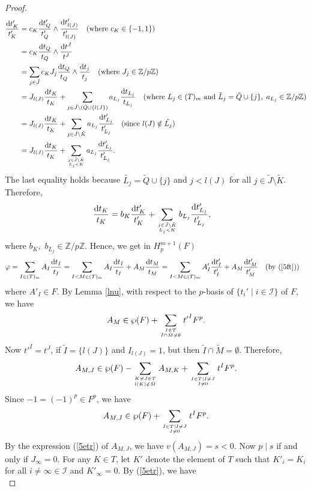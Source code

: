 \documentclass[times,10pt]{amsart}
\newcommand{\Z}{\ensuremath{\mathbb{Z}}}
\newcommand{\dd}{{\rm d}}
\newcommand{\I}{\ensuremath{\mathcal{I}}}
\renewcommand{\phi}{\varphi}
\begin{document}
\begin{proof}
\begin{align*}
     \frac{\dd t'_K}{t'_K}&= c_K \frac{ \dd t'_Q}{t'_Q} \wedge \frac{ \dd t'_{l(J)}}{t'_{l(J)}}\quad \text{(where $c_K\in \{-1,1\}$)}\\&=  c_K \frac { \dd t_Q} {t_Q}\wedge \frac {\dd t^J} {t^J}\\&=  \sum_{j\in \tilde{J}} c_KJ_j\frac{\dd  t_{Q}} {t_Q}\wedge \frac{\dd t_j}{t_j}\quad \text{(where $J_j\in \Z/{p\Z}$)} \\&=   J_{l(J)} \frac{\dd t_K}{t_K} + \sum_{j\in \tilde{J}\setminus (\tilde{Q}\cup \{l(J\})} a_{L_j}\frac{ \dd t_{L_j}} {t_{L_j}}\quad (\text{where } L_j\in (T)_m \text{ and }\tilde{L}_j=\tilde{Q}\cup \{j\},\hspace{1mm} a_{L_j}\in \Z/{p\Z})\\&= J_{l(J)}\frac{\dd t_K}{t_K}+ \sum_{j\in\tilde{J} \setminus \tilde{K}} a_{L_j}\frac{\dd t'_{L_j}}{t'_{L_j}} \quad \text{(since  $ l(J)\notin \tilde{L_j}$)}  \\&= J_{l(J)}\frac{\dd t_K}{t_K} + \sum_{j\in \tilde{J}\setminus \tilde{K}\atop L_j<K}  a_{L_j} \frac{\dd t'_{L_j}}{t'_{L_j}}. \end{align*}   The last equality holds because $\tilde{L_j}= \tilde{Q}\cup\{j\}$ and  $j<l(J)$ for all $j\in \tilde{J}\setminus \tilde{K}$. {Therefore, }\begin{align}\label{5ft} \frac {\dd t_K}{t_K} &= b_K \frac{\dd t'_K}{t'_K} +\sum_{j\in \tilde{J}\setminus \tilde{K}\atop L_j<K} b_{L_j}  \frac{\dd t'_{L_j}}{t'_{L_j}}, 
     \end{align} where  $ b_K,$ $ b_{L_j}\in \Z/{p\Z}$. Hence, we get in $H_p^{m+1}(F)$  \begin{align*}
         \phi&= \sum_{I\in (T)_m} A_I \frac{\dd t_I}{t_I}= \sum_{I<M\in (T)_m} A_I\frac{\dd t_I}{t_I}+ A_M\frac{\dd t_M}{t_M}= \sum_{I<M\in (T)_m} A'_I\frac{\dd t'_I}{t'_I}+  A_M\frac{\dd t'_M}{t'_M} \quad \text{(by (\ref{5ft}))}
     \end{align*} where $A'_I\in F$. By  Lemma \ref{lnu}, with respect to the $p$-basis of $\{t_i'\mid i\in \I\}$ of $F$, we have  \begin{equation*} A_M\in \wp(F)+ \sum_{I\in T\atop \tilde{I}\cap \tilde{M}\neq \emptyset } {t'}^IF^p.\end{equation*}  Now $ {t'}^I= t^J$, if $\tilde{I}=\{l(J)\}$ and $I_{l(J)}=1$, but then $\tilde{I}\cap \tilde{M}=\emptyset$. Therefore,  \begin{equation*}A_{M,J}\in \wp(F)- \sum\limits_{ K\neq J\in T\atop l(K)\notin \tilde{M}} A_{M,K}+ \sum\limits_{I\in T\mid  I\neq J\atop I\neq 0}  t^IF^p.\end{equation*} Since $-1= (-1)^p\in F^p$, we have  \begin{equation}\label{5sr}A_{M,J}\in \wp(F)+ \sum\limits_{I\in T\mid  I\neq J\atop I\neq 0}  t^IF^p.\end{equation} By the expression (\ref{5etr}) of  $ A_{M,J}$, we have  $v(A_{M,J})=s<0$. Now {$p\mid s$} if and only if $J_{\infty}=0$.  For any $K\in T$, let $K'$ denote the element of $T$ such that $K'_{i}=K_i$ for all $i\neq \infty\in \I$ and $K'_{\infty}=0$.  By (\ref{5etr}), we have \begin{equation}\label{5fr}

\end{equation}
\end{proof}
\end{document}
